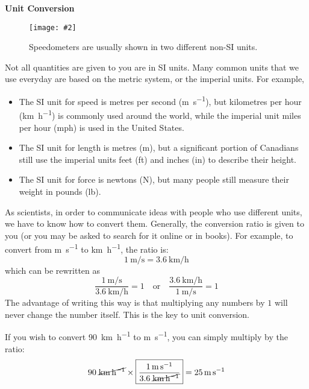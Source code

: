 \documentclass{../../oss-handout}
\newcommand{\pic}[2]{\texttt{[image: \#2]}}
\begin{document}
\begin{center}
  \textbf{Unit Conversion}
\end{center}

\begin{wrapfigure}{r}{.42\textwidth}
  \vspace{-.2in}
  \centering
  \pic{.4}{../graphics/MP9004482912}
  \caption{Speedometers are usually shown in two different non-SI units.}
\end{wrapfigure}
Not all quantities are given to you are in SI units. Many common units that we
use everyday are based on the metric system, or the imperial units. For example,
\begin{itemize}[topsep=0pt,leftmargin=12pt]
\item The SI unit for speed is metres per second (\si{\metre\per\second}), but
  kilometres per hour (\si{\kilo\metre\per\hour}) is commonly used around the
  world, while the imperial unit miles per hour (\si{mph}) is used in the
  United States.
\item The SI unit for length is metres (\si{\metre}), but a significant
  portion of Canadians still use the imperial units feet (\si{ft}) and inches
  (\si{in}) to describe their height.
\item The SI unit for force is newtons (\si{\newton}), but many people still
  measure their weight in pounds (\si{lb}).
\end{itemize}
As scientists, in order to communicate ideas with people who use different
units, we have to know how to convert them. Generally, the conversion ratio is
given to you (or you may be asked to search for it online or in books). For
example, to convert from \si{\metre\per\second} to \si{\kilo\metre\per\hour},
the ratio is:
\begin{equation*}
  \SI{1}{\metre\per\second}=\SI{3.6}{\kilo\metre\per\hour}
\end{equation*}
which can be rewritten as
\begin{equation*}
  \frac{\SI{1}{\metre\per\second}}{\SI{3.6}{\kilo\metre\per\hour}}=1
  \quad\text{or}\quad
  \frac{\SI{3.6}{\kilo\metre\per\hour}}{\SI{1}{\metre\per\second}}=1
\end{equation*}
The advantage of writing this way is that multiplying any numbers by $1$ will
never change the number itself. This is the key to unit conversion.

If you wish to convert \SI{90}{\kilo\metre\per\hour} to \si{\metre\per\second},
you can simply multiply by the ratio:
\begin{equation*}
  90\;\cancel{\si{\kilo\metre\per\hour}}
  \times
  \boxed{
    \frac{\SI{1}{\metre\per\second}}{3.6\;\cancel{\si{\kilo\metre\per\hour}}}
  }
  =\SI{25}{\metre\per\second}
\end{equation*}
\end{document}
